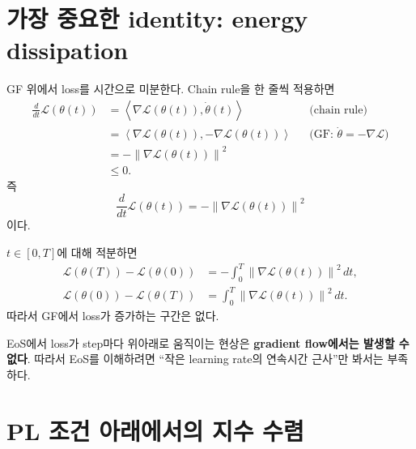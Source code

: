\documentclass[11pt,a4paper,oneside,openany]{memoir}
\newcommand{\Loss}{\mathcal{L}}
\newcommand{\grad}{\nabla}
\newcommand{\inner}[2]{\left\langle #1,#2\right\rangle}
\newcommand{\norm}[1]{\left\lVert #1\right\rVert}
\theoremstyle{definition}
\begin{document}
\section{가장 중요한 identity: energy dissipation}

GF 위에서 loss를 시간으로 미분한다. Chain rule을 한 줄씩 적용하면
\begin{align}
  \frac{d}{dt}\Loss(\theta(t))
  &= \inner{\grad\Loss(\theta(t))}{\dot\theta(t)}
  &&\text{(chain rule)}\\
  &= \inner{\grad\Loss(\theta(t))}{-\grad\Loss(\theta(t))}
  &&\text{(GF: $\dot\theta=-\grad\Loss$)}\\
  &= -\norm{\grad\Loss(\theta(t))}^2\\
  &\le 0.
  \label{eq:energy-dissipation}
\end{align}
즉
\begin{equation}
  \boxed{\frac{d}{dt}\Loss(\theta(t))=-\norm{\grad\Loss(\theta(t))}^2}
\end{equation}
이다.

$t\in[0,T]$에 대해 적분하면
\begin{align}
  \Loss(\theta(T))-\Loss(\theta(0))
  &= -\int_0^T \norm{\grad\Loss(\theta(t))}^2\,dt,\\
  \Loss(\theta(0))-\Loss(\theta(T))
  &= \int_0^T \norm{\grad\Loss(\theta(t))}^2\,dt.
  \label{eq:energy-integral}
\end{align}
따라서 GF에서 loss가 증가하는 구간은 없다.

\begin{keybox}
EoS에서 loss가 step마다 위아래로 움직이는 현상은 \textbf{gradient flow에서는 발생할 수 없다}.
따라서 EoS를 이해하려면 ``작은 learning rate의 연속시간 근사''만 봐서는 부족하다.
\end{keybox}

\section{PL 조건 아래에서의 지수 수렴}
\end{document}
